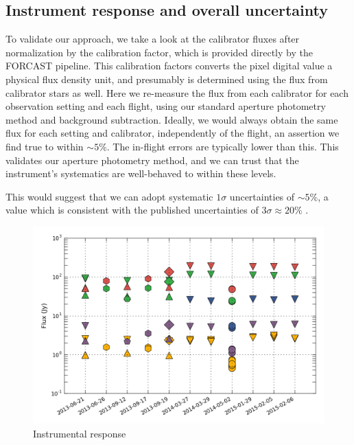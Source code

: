 \subsection{Instrument response and overall uncertainty}
To validate our approach, we take a look at the calibrator fluxes after normalization by the calibration factor, which is provided directly by the FORCAST pipeline. This calibration factors converts the pixel digital value a physical flux density unit, and presumably is determined using the flux from calibrator stars as well. Here we re-measure the flux from each calibrator for each observation setting and each flight, using our standard aperture photometry method and background subtraction. Ideally, we would always obtain the same flux for each setting and calibrator, independently of the flight, an assertion we find true to within $\sim 5\%$. The in-flight errors are typically lower than this. This validates our aperture photometry method, and we can trust that the instrument's systematics are well-behaved to within these levels. 

This would suggest that we can adopt systematic $1\sigma$ uncertainties of $\sim 5\%$, a value which is consistent with the published uncertainties of $3\sigma \approx 20\%$ \citep{DeBuizer:2012ie}.


\begin{figure}[!h]
\begin{center}
\includegraphics[width=\textwidth]{Figures/Phot_val.png}
\vspace{-0.5cm}
\caption[Instrumental response]{Instrumental response}
\label{fig:response}
\end{center}
\end{figure}





